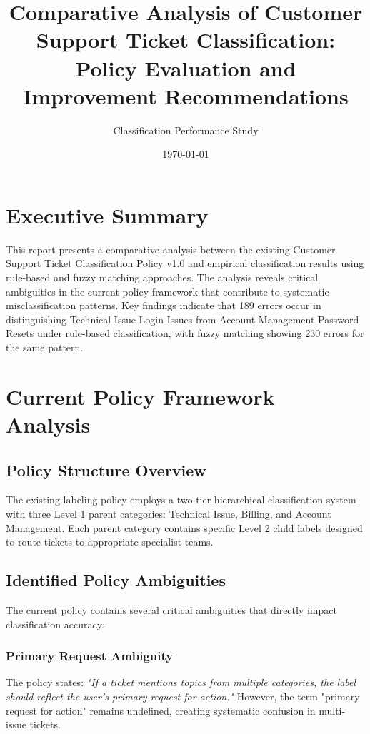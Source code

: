 \documentclass[11pt, a4paper]{article}
\title{\textbf{Comparative Analysis of Customer Support Ticket Classification: \\Policy Evaluation and Improvement Recommendations}}
\author{Classification Performance Study}
\date{\today}
\begin{document}
\maketitle

\tableofcontents
\newpage

\section{Executive Summary}

This report presents a comparative analysis between the existing Customer Support Ticket Classification Policy v1.0 and empirical classification results using rule-based and fuzzy matching approaches. The analysis reveals critical ambiguities in the current policy framework that contribute to systematic misclassification patterns. Key findings indicate that 189 errors occur in distinguishing Technical Issue Login Issues from Account Management Password Resets under rule-based classification, with fuzzy matching showing 230 errors for the same pattern.

\section{Current Policy Framework Analysis}

\subsection{Policy Structure Overview}

The existing labeling policy employs a two-tier hierarchical classification system with three Level 1 parent categories: Technical Issue, Billing, and Account Management. Each parent category contains specific Level 2 child labels designed to route tickets to appropriate specialist teams.

\subsection{Identified Policy Ambiguities}

The current policy contains several critical ambiguities that directly impact classification accuracy:

\subsubsection{Primary Request Ambiguity}
The policy states: \textit{"If a ticket mentions topics from multiple categories, the label should reflect the user's primary request for action."} However, the term "primary request for action" remains undefined, creating systematic confusion in multi-issue tickets.
\end{document}
